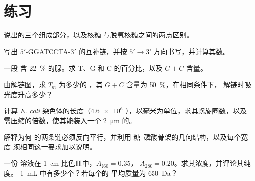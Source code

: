 \section{练习}

\begin{exercise}[$\star$]\label{exo:b1:nucleic-acids:1}
说出的三个组成部分，以及核糖
与脱氧核糖之间的两点区别。
\end{exercise}

\begin{exercise}[$\star$]\label{exo:b1:nucleic-acids:2}
写出 $5'$-GGATCCTA-$3'$ 的互补链，并按 $5' \to 3'$
方向书写，并计算其数。
\end{exercise}

\begin{exercise}[$\star$]\label{exo:b1:nucleic-acids:3}
一段  含 \qty{22}{\%} 的腺。求 T、G 和
C 的百分比，以及 $G + C$ 含量。
\end{exercise}

\begin{exercise}[$\star$]\label{exo:b1:nucleic-acids:4}
由解链图，求 $T_m$ 为多少的 ，其
$G + C$ 含量为 \qty{50}{\%}，在相同条件下，
解链时吸光度升高多少？
\end{exercise}

\begin{exercise}[$\star\star$]\label{exo:b1:nucleic-acids:5}
计算 \emph{E. coli} 染色体的长度（$\num{4.6e6}$
），以毫米为单位，求其螺旋圈数，以及
需压缩的倍数，使其能装入一个 \qty{2}{\micro m} 的。
\end{exercise}

\begin{exercise}[$\star\star$]\label{exo:b1:nucleic-acids:6}
解释为何  的两条链必须反向平行，并利用
糖–磷酸骨架的几何结构，以及每个宽度
须相同这一要求加以说明。
\end{exercise}

\begin{exercise}[$\star\star$]\label{exo:b1:nucleic-acids:7}
一份  溶液在 \qty{1}{cm} 比色皿中，$A_{260} = 0.35$，
$A_{280} = 0.20$。求其浓度，并评论其纯度。
\qty{1}{mL} 中有多少个？若每个的
平均质量为 \qty{650}{Da}？
\end{exercise}

